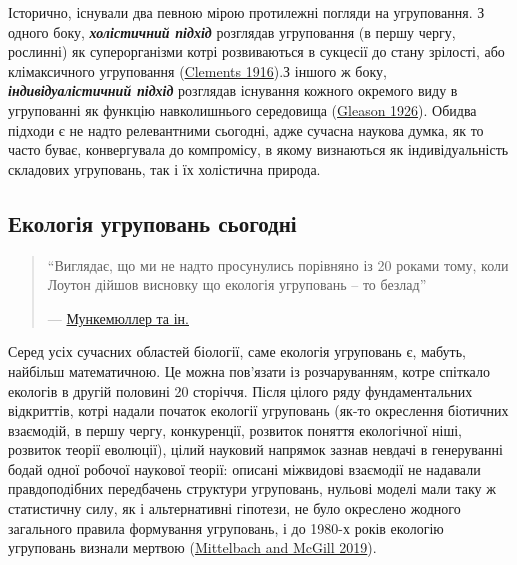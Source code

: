 \documentclass[
  11pt,
]{book}
\begin{document}
Історично, існували два певною мірою протилежні погляди на угруповання.
З одного боку, \textbf{\emph{холістичний підхід}} розглядав угруповання
(в першу чергу, рослинні) як суперорганізми котрі розвиваються в
сукцесії до стану зрілості, або клімаксичного угруповання
(\href{https://scholar.google.com/scholar_lookup?title=Plant\%20Succession\%3A\%20Analysis\%20of\%20the\%20Development\%20of\%20Vegetation&author=\%20&publication_year=1916&book=Plant\%20Succession\%3A\%20Analysis\%20of\%20the\%20Development\%20of\%20Vegetation}{Clements
1916}).З іншого ж боку, \textbf{\emph{індивідуалістичний підхід}}
розглядав існування кожного окремого виду в угрупованні як функцію
навколишнього середовища (\href{https://doi.org/10.2307/2479933}{Gleason
1926}). Обидва підходи є не надто релевантними сьогодні, адже сучасна
наукова думка, як то часто буває, конвергувала до компромісу, в якому
визнаються як індивідуальність складових угруповань, так і їх холістична
природа.

\subsection{Екологія угруповань сьогодні}\label{comm-ecol-today}

\begin{quote}
``Виглядає, що ми не надто просунулись порівняно із 20 роками тому, коли
Лоутон дійшов висновку що екологія угруповань -- то безлад''

--- \href{https://doi.org/10.1111/geb.13098}{Мункемюллер та ін.}
\end{quote}

Серед усіх сучасних областей біології, саме екологія угруповань є,
мабуть, найбільш математичною. Це можна пов'язати із розчаруванням,
котре спіткало екологів в другій половині 20 сторіччя. Після цілого ряду
фундаментальних відкриттів, котрі надали початок екології угруповань
(як-то окреслення біотичних взаємодій, в першу чергу, конкуренції,
розвиток поняття екологічної ніші, розвиток теорії еволюції), цілий
науковий напрямок зазнав невдачі в генеруванні бодай одної робочої
наукової теорії: описані міжвидові взаємодії не надавали правдоподібних
передбачень структури угруповань, нульові моделі мали таку ж статистичну
силу, як і альтернативні гіпотези, не було окреслено жодного загального
правила формування угруповань, і до 1980-х років екологію угруповань
визнали мертвою
(\href{https://doi.org/10.1093/oso/9780198835851.001.0001}{Mittelbach
and McGill 2019}).
\end{document}

